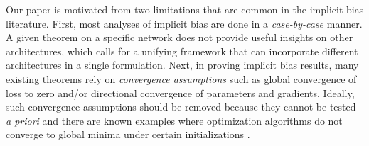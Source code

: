\documentclass{article} %
\begin{document}
Our paper is motivated from two limitations that are common in the implicit bias literature. First, most analyses of implicit bias are done in a \emph{case-by-case} manner. A given theorem on a specific network does not provide useful insights on other architectures, which calls for a unifying framework that can incorporate different architectures in a single formulation.
Next, in proving implicit bias results, many existing theorems rely on \emph{convergence assumptions} such as global convergence of loss to zero and/or directional convergence of parameters and gradients. Ideally, such convergence assumptions should be removed because they cannot be tested \emph{a priori} and there are known examples where optimization algorithms do not converge to global minima under certain initializations \citep{bartlett2018gradient, arora2019convergence}.

\end{document}
